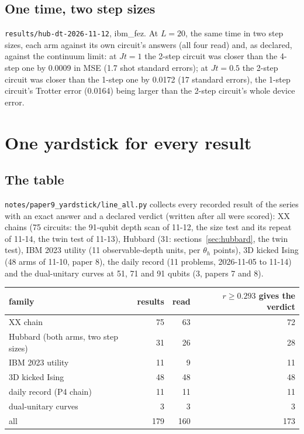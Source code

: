 \documentclass[10pt,a4paper]{article}
\begin{document}
\subsection{One time, two step sizes}
\texttt{results/hub-dt-2026-11-12}, ibm\_fez. At $L = 20$, the same time in two step sizes, each arm against its own
circuit's answers (all four read) and, as declared, against the continuum limit: at $Jt = 1$ the 2-step circuit was
closer than the 4-step one by 0.0009 in MSE (1.7 shot standard errors); at $Jt = 0.5$ the 2-step circuit was closer
than the 1-step one by 0.0172 (17 standard errors), the 1-step circuit's Trotter error (0.0164) being larger than the
2-step circuit's whole device error.

\section{One yardstick for every result}\label{sec:yardstick}
\subsection{The table}
\texttt{notes/paper9\_yardstick/line\_all.py} collects every recorded result of the series with an exact answer and a
declared verdict (written after all were scored): XX chains (75 circuits: the 91-qubit depth scan of 11-12, the size
test and its repeat of 11-14, the twin test of 11-13), Hubbard (31: sections~\ref{sec:hubbard}, the twin test),
IBM 2023 utility (11 observable-depth units, per $\theta_h$ points), 3D kicked Ising (48 arms of 11-10, paper 8), the
daily record (11 problems, 2026-11-05 to 11-14) and the dual-unitary curves at 51, 71 and 91 qubits (3, papers 7 and 8).

\begin{center}\small
\begin{tabular}{lrrr}
\toprule
family & results & read & $r \ge 0.293$ gives the verdict \\
\midrule
XX chain & 75 & 63 & 72 \\
Hubbard (both arms, two step sizes) & 31 & 26 & 28 \\
IBM 2023 utility & 11 & 9 & 11 \\
3D kicked Ising & 48 & 48 & 48 \\
daily record (P4 chain) & 11 & 11 & 11 \\
dual-unitary curves & 3 & 3 & 3 \\
\midrule
all & 179 & 160 & 173 \\
\bottomrule
\end{tabular}
\end{center}
\end{document}
